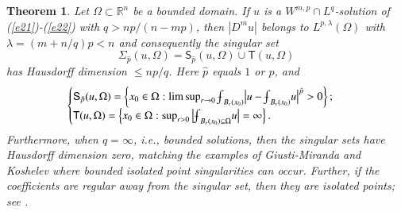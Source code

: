 \documentclass[12pt]{amsart}
\newtheorem{theorem}{Theorem}[section]
\begin{document}
\begin{theorem}\label{t1} Let $\Omega\subset\mathbb R^n$ be a bounded domain. If $u$ is a $W^{m,p}\cap L^q$-solution of (\ref{e21})-(\ref{e22}) with $q>np/(n-mp)$, then $|D^mu|$ belongs to $L^{p,\lambda}(\Omega)$ with $\lambda=(m+n/q)p<n$ and consequently the singular set
$$
\Sigma_{\hat{p}}(u,\Omega)=\mathsf{S}_{\hat{p}}(u,\Omega)\cup \mathsf{T}(u,\Omega)
$$
has Hausdorff dimension $\le np/q$. Here $\hat{p}$ equals $1$ or $p$, and
$$
\begin{cases}
\mathsf{S}_{\hat{p}}(u,\Omega)=\left\{x_0\in \Omega: \limsup_{r \to 0}
{{\mathchoice
{{{\setbox0=\hbox{$\displaystyle{\textstyle{-}}{\int}$ }
\vcenter{\hbox{$\textstyle{-}$ }}\kern-.6\wd0}}}{{{\setbox0=\hbox{$\textstyle{\scriptstyle{-}}{\int}$ }
\vcenter{\hbox{$\scriptstyle{-}$ }}\kern-.6\wd0}}}{{{\setbox0=\hbox{$\scriptstyle{\scriptscriptstyle{-}}{\int}$ }
\vcenter{\hbox{$\scriptscriptstyle{-}$ }}\kern-.6\wd0}}}{{{\setbox0=\hbox{$\scriptscriptstyle{\scriptscriptstyle{-}}{\int}$ }
\vcenter{\hbox{$\scriptscriptstyle{-}$ }}\kern-.6\wd0}}}\!\int}}_{B_r(x_0)}\big|u -{{\mathchoice
{{{\setbox0=\hbox{$\displaystyle{\textstyle{-}}{\int}$ }
\vcenter{\hbox{$\textstyle{-}$ }}\kern-.6\wd0}}}{{{\setbox0=\hbox{$\textstyle{\scriptstyle{-}}{\int}$ }
\vcenter{\hbox{$\scriptstyle{-}$ }}\kern-.6\wd0}}}{{{\setbox0=\hbox{$\scriptstyle{\scriptscriptstyle{-}}{\int}$ }
\vcenter{\hbox{$\scriptscriptstyle{-}$ }}\kern-.6\wd0}}}{{{\setbox0=\hbox{$\scriptscriptstyle{\scriptscriptstyle{-}}{\int}$ }
\vcenter{\hbox{$\scriptscriptstyle{-}$ }}\kern-.6\wd0}}}\!\int}}_{B_r(x_0)}u\big|^{\hat{p}}> 0 \right\};\\
\mathsf{T}(u,\Omega)=\left\{x_0\in\Omega: \sup_{r>0}\big|{{\mathchoice
{{{\setbox0=\hbox{$\displaystyle{\textstyle{-}}{\int}$ }
\vcenter{\hbox{$\textstyle{-}$ }}\kern-.6\wd0}}}{{{\setbox0=\hbox{$\textstyle{\scriptstyle{-}}{\int}$ }
\vcenter{\hbox{$\scriptstyle{-}$ }}\kern-.6\wd0}}}{{{\setbox0=\hbox{$\scriptstyle{\scriptscriptstyle{-}}{\int}$ }
\vcenter{\hbox{$\scriptscriptstyle{-}$ }}\kern-.6\wd0}}}{{{\setbox0=\hbox{$\scriptscriptstyle{\scriptscriptstyle{-}}{\int}$ }
\vcenter{\hbox{$\scriptscriptstyle{-}$ }}\kern-.6\wd0}}}\!\int}}_{B_r(x_0)\subseteq\Omega}u\big|=\infty\right\}.
\end{cases}
$$
Furthermore, when $q=\infty$, i.e., bounded solutions, then the singular sets have Hausdorff dimension zero, matching the examples of Giusti-Miranda and Koshelev where bounded isolated point singularities can occur. Further, if the coefficients are regular away from the singular set, then they are isolated points; see \cite[Chapter IX]{G1983}.
\end{theorem}
\end{document}
